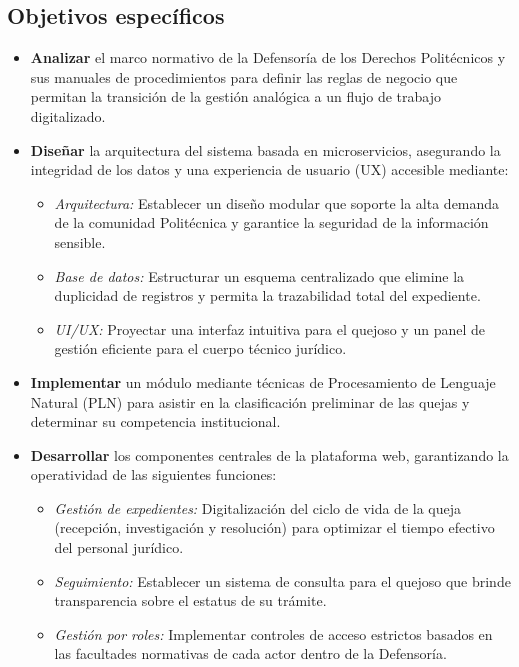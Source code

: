 \subsection{Objetivos específicos}
\begin{itemize}
    \item \textbf{Analizar} el marco normativo de la Defensoría de los Derechos Politécnicos y sus manuales de procedimientos para definir las reglas de negocio que permitan la transición de la gestión analógica a un flujo de trabajo digitalizado.
    
    \item \textbf{Diseñar} la arquitectura del sistema basada en microservicios, asegurando la integridad de los datos y una experiencia de usuario (UX) accesible mediante:
    \begin{itemize}
        \item \textit{Arquitectura:} Establecer un diseño modular que soporte la alta demanda de la comunidad Politécnica y garantice la seguridad de la información sensible.
        \item \textit{Base de datos:} Estructurar un esquema centralizado que elimine la duplicidad de registros y permita la trazabilidad total del expediente.
        \item \textit{UI/UX:} Proyectar una interfaz intuitiva para el quejoso y un panel de gestión eficiente para el cuerpo técnico jurídico.
    \end{itemize}

    \item \textbf{Implementar} un módulo mediante técnicas de Procesamiento de Lenguaje Natural (PLN) para asistir en la clasificación preliminar de las quejas y determinar su competencia institucional.

    \item \textbf{Desarrollar} los componentes centrales de la plataforma web, garantizando la operatividad de las siguientes funciones:
    \begin{itemize}
        \item \textit{Gestión de expedientes:} Digitalización del ciclo de vida de la queja (recepción, investigación y resolución) para optimizar el tiempo efectivo del personal jurídico.
        \item \textit{Seguimiento:} Establecer un sistema de consulta para el quejoso que brinde transparencia sobre el estatus de su trámite.
        \item \textit{Gestión por roles:} Implementar controles de acceso estrictos basados en las facultades normativas de cada actor dentro de la Defensoría.
    \end{itemize}
\end{itemize}

